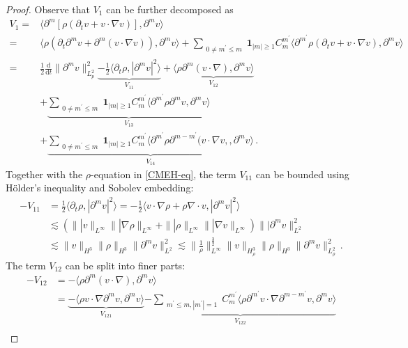 \documentclass[reqno,11pt]{amsart}
\numberwithin{equation}{section}
\def\p{\partial}
\def\d{\mathrm{d}}
\def\no{\nonumber}
\begin{document}
\begin{proof}
Observe that $V_1$ can be further decomposed as
\begin{equation}\label{v-eq1}
	\begin{aligned}
	V_1	=&\langle	\p^m[\rho (\p_t v + v \cdot \nabla v)],\p^m v\rangle \\
    = & \langle	\rho(\p_t\p^mv+\p^m(v\cdot\nabla v)),\p^m v  \rangle+
	\sum_{\substack{ 0\neq m^{\prime}\leq m}}\mathbf{1}_{|m|\geq 1} C^{m^{\prime}}_{m} \langle \p^{m^{\prime}} \rho (\p_t v+v\cdot\nabla v),\partial^{m} v \rangle\\
    = & \frac{1}{2} \frac{\d}{\d t} \|\p^mv\|^2_{L^2_p}\underset{V_{11}}{\underbrace{-\frac{1}{2}\langle\p_t\rho,|\p^mv|^2\rangle}}+\underset{V_{12}}{\underbrace{\langle\rho\p^m(v\cdot\nabla) ,\p^mv \rangle}}\\
    & +\underset{V_{13}}{\underbrace{\sum_{\substack{ 0\neq m^{\prime}\leq m}}\mathbf{1}_{|m|\geq 1} C^{m^{\prime}}_{m} \langle \p^{m^{\prime}} \rho\partial^{m} v  ,\partial^{m} v \rangle}} \\
    & +\underset{V_{14}}{\underbrace{\sum_{\substack{ 0\neq m^{\prime}\leq m}}\mathbf{1}_{|m|\geq 1} C^{m^{\prime}}_{m} \langle \p^{m^{\prime}} \rho\partial^{m-m^{\prime}} (v\cdot\nabla v,  ,\partial^{m} v \rangle}}
	\,.
	\end{aligned}
\end{equation}
Together with the $\rho$-equation in \eqref{CMEH-eq}, the term $V_{11}$ can be bounded using H\"older's inequality and Sobolev embedding:
\begin{equation}\label{v-eq11}
	\begin{aligned}
-V_{11}&= \frac{1}{2}\langle\p_t\rho,|\p^mv|^2\rangle=-\frac{1}{2}\langle v\cdot \nabla \rho+\rho\nabla\cdot v,|\p^m v|^2\rangle
\\&\lesssim(\||v\|_{L^\infty}\||\nabla\rho\|_{L^\infty}+\||\rho\|_{L^\infty}\||\nabla v\|_{L^\infty})\||\p^mv\|^2_{L^2}\\&\lesssim\|v\|_{H^3}\|\rho\|_{H^3}\|\p^mv\|^2_{L^2} \lesssim\|\frac{1}{\rho}\|^{\frac{3}{2}}_{L^\infty}\|v\|_{H^3_\rho}\|\rho\|_{H^3}\|\p^mv\|^2_{L^2_\rho}
\,.
	\end{aligned}
\end{equation}
The term $V_{12}$ can be split into finer parts:
	\begin{align}\label{v-eq12}
\no -V_{12} & = -\langle\rho\p^m(v\cdot\nabla) ,\p^mv \rangle\\
& =\underset{V_{121}}{\underbrace{-\langle\rho v\cdot\nabla\p^m v ,\p^mv \rangle}}\underset{V_{122}}{\underbrace{-\sum_{\substack{ m^{\prime}\leq m,|m^{\prime}|=1}}C^{m^{\prime}}_m\langle\rho \p^{m^{\prime}}v\cdot\nabla\p^{m-m^{\prime}} v ,\p^mv \rangle}}\\

\end{align}
\end{proof}
\end{document}
